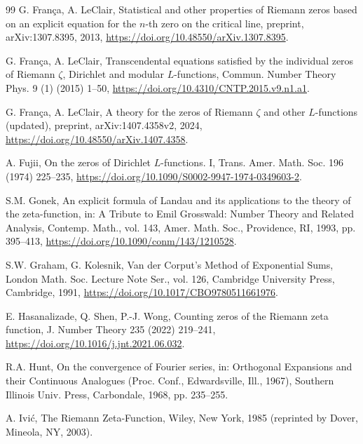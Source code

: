 \documentclass[preprint,12pt]{elsarticle}
\numberwithin{equation}{section}
\theoremstyle{plain}
\theoremstyle{definition}
\theoremstyle{remark}
\begin{document}
\begin{thebibliography}{99}
G. Fran\c{c}a, A. LeClair, Statistical and other properties of Riemann zeros based on an explicit equation for the $n$-th zero on the critical line, preprint, arXiv:1307.8395, 2013, \href{https://doi.org/10.48550/arXiv.1307.8395}{https://doi.org/10.48550/arXiv.1307.8395}.

G. Fran\c{c}a, A. LeClair, Transcendental equations satisfied by the individual zeros of Riemann $\zeta$, Dirichlet and modular $L$-functions, Commun. Number Theory Phys. 9 (1) (2015) 1--50, \href{https://doi.org/10.4310/CNTP.2015.v9.n1.a1}{https://doi.org/10.4310/CNTP.2015.v9.n1.a1}.

G. Fran\c{c}a, A. LeClair, A theory for the zeros of Riemann $\zeta$ and other $L$-functions (updated), preprint, arXiv:1407.4358v2, 2024, \href{https://doi.org/10.48550/arXiv.1407.4358}{https://doi.org/10.48550/arXiv.1407.4358}.

A. Fujii, On the zeros of Dirichlet $L$-functions. I, Trans. Amer. Math. Soc. 196 (1974) 225--235, \href{https://doi.org/10.1090/S0002-9947-1974-0349603-2}{https://doi.org/10.1090/S0002-9947-1974-0349603-2}.

S.M. Gonek, An explicit formula of Landau and its applications to the theory of the zeta-function, in: A Tribute to Emil Grosswald: Number Theory and Related Analysis, Contemp. Math., vol. 143, Amer. Math. Soc., Providence, RI, 1993, pp. 395--413, \href{https://doi.org/10.1090/conm/143/1210528}{https://doi.org/10.1090/conm/143/1210528}.

S.W. Graham, G. Kolesnik, Van der Corput's Method of Exponential Sums, London Math. Soc. Lecture Note Ser., vol. 126, Cambridge University Press, Cambridge, 1991, \href{https://doi.org/10.1017/CBO9780511661976}{https://doi.org/10.1017/CBO9780511661976}.

E. Hasanalizade, Q. Shen, P.-J. Wong, Counting zeros of the Riemann zeta function, J. Number Theory 235 (2022) 219--241, \href{https://doi.org/10.1016/j.jnt.2021.06.032}{https://doi.org/10.1016/j.jnt.2021.06.032}.

R.A. Hunt, On the convergence of Fourier series, in: Orthogonal Expansions and their Continuous Analogues (Proc. Conf., Edwardsville, Ill., 1967), Southern Illinois Univ. Press, Carbondale, 1968, pp. 235--255.

A. Ivi\'c, The Riemann Zeta-Function, Wiley, New York, 1985 (reprinted by Dover, Mineola, NY, 2003).


\end{thebibliography}
\end{document}
